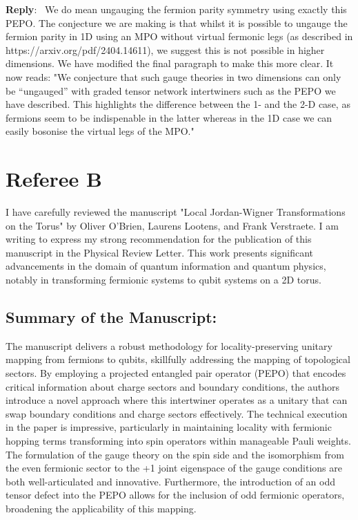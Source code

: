 \documentclass[aps,prx,floatfix,10pt,amssymb,amsfont,amsmath,superscriptaddress,float,nofootinbib,longbibliography,nobalancelastpage]{revtex4-2}
\newenvironment{reply}
   {\medskip \noindent \begin{sf}\textbf{Reply}:\ \color{blue}  }
   {\medskip \end{sf}}
\begin{document}
\begin{itemize}
\begin{reply}
    We do mean ungauging the fermion parity symmetry using exactly this PEPO. The conjecture we are making is that whilst it is possible to ungauge the fermion parity in 1D using an MPO without virtual fermonic legs (as described in https://arxiv.org/pdf/2404.14611), we suggest this is not possible in higher dimensions. We have modified the final paragraph to make this more clear. It now reads: "We conjecture that such gauge theories in two dimensions can only be ``ungauged''  with graded tensor network intertwiners such as the PEPO we have described. This highlights the difference between the 1- and the 2-D case, as fermions seem to be indispenable in the latter whereas in the 1D case we can easily bosonise the virtual legs of the MPO."
\end{reply}

\end{itemize}
\section*{Referee B}
I have carefully reviewed the manuscript "Local Jordan-Wigner Transformations on the Torus" by Oliver O'Brien, Laurens Lootens, and Frank Verstraete. I am writing to express my strong recommendation for the publication of this manuscript in the Physical Review Letter. This work presents significant advancements in the domain of quantum information and quantum physics, notably in transforming fermionic systems to qubit systems on a 2D torus.

\subsection*{Summary of the Manuscript:}


The manuscript delivers a robust methodology for locality-preserving unitary mapping from fermions to qubits, skillfully addressing the mapping of topological sectors. By employing a projected entangled pair operator (PEPO) that encodes critical information about charge sectors and boundary conditions, the authors introduce a novel approach where this intertwiner operates as a unitary that can swap boundary conditions and charge sectors effectively. The technical execution in the paper is impressive, particularly in maintaining locality with fermionic hopping terms transforming into spin operators within manageable Pauli weights. The formulation of the gauge theory on the spin side and the isomorphism from the even fermionic sector to the +1 joint eigenspace of the gauge conditions are both well-articulated and innovative. Furthermore, the introduction of an odd tensor defect into the PEPO allows for the inclusion of odd fermionic operators, broadening the applicability of this mapping.
\end{document}
